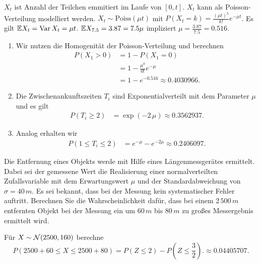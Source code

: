 \solution $X_t$ ist Anzahl der Teilchen emmitiert im Laufe von
$[0,t]$. $X_t$ kann als Poisson-Verteilung modelliert werden. $X_t \sim \text{Poiss}(\mu t)$ mit $P(X_t = k) = \frac{ (\mu t)^{k} }{k!} e^{- \mu
t}$. Es gilt $\mathbb E X_t = \operatorname{Var} X_t = \mu t$. $\mathbb E X_{7.5} = 3.87 = 7.5 \mu$
impliziert $\mu = \frac{3.87}{7.5} = 0.516$.
\begin{enumerate}
    \item Wir nutzen die Homogenität der Poisson-Verteilung und berechnen
        \begin{align*}
            P(X_1 > 0) &= 1 - P(X_1=0) \\
            &= 1 - \frac{\mu^0}{0!}e^{-\mu} \\ 
            &= 1-e^{-0.516} \approx 0.4030966.
        \end{align*}
    \item Die Zwischenankunftszeiten $T_i$ sind Exponentialverteilt mit dem Parameter $\mu$
        und es gilt
        \begin{align*}
            P(T_i \geq 2) &= \exp( -2 \,\mu ) \approx 0.3562937.
        \end{align*}
    \item Analog erhalten wir
        \begin{align*}
            P( 1 \leq T_i \leq 2) &= e^{-\mu}-e^{-2\mu} \approx 0.2406097.
        \end{align*}
\end{enumerate}


 Die Entfernung eines Objekts werde mit Hilfe
eines Längenmessgerätes ermittelt. Dabei sei der gemessene Wert die Realisierung
einer normalverteilten Zufallsvariable mit dem Erwartungswert $\mu$ und der
Standardabweichung von $\sigma = 40\,m$. Es sei bekannt, dass bei der Messung
kein systematischer Fehler auftritt. Berechnen Sie die Wahrscheinlichkeit
dafür, dass bei einem $2\,500\,m$ entfernten Objekt bei der Messung ein um
$60\,m$ bis $80\,m$ zu großes Messergebnis ermittelt wird. 

\solution Für $X \sim \mathcal N(2500, 160)$ berechne 
\begin{equation*}
    P(2500 + 60 \leq X \leq 2500 + 80) = P(Z \leq 2) - P(Z \leq \frac{3}{2}).
        \approx 0.04405707.
\end{equation*}


